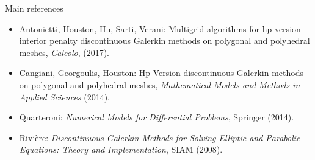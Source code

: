 \documentclass{beamer}
\begin{document}
\begin{frame}{Main references}
\begin{itemize}
	\item Antonietti, Houston, Hu, Sarti, Verani: Multigrid 
	algorithms for hp-version interior penalty discontinuous Galerkin methods 
	on polygonal and polyhedral meshes, \emph{Calcolo}, (2017).
	\item Cangiani, Georgoulis, Houston: Hp-Version discontinuous 
	Galerkin methods on polygonal and polyhedral meshes, \emph{Mathematical 
		Models and Methods in Applied Sciences} (2014).
	\item Quarteroni: \emph{Numerical Models for Differential Problems}, Springer (2014).
	\item Rivière: \emph{Discontinuous Galerkin Methods for Solving Elliptic and 
		Parabolic Equations: Theory and Implementation}, SIAM (2008).
\end{itemize}
\end{frame}
\end{document}
